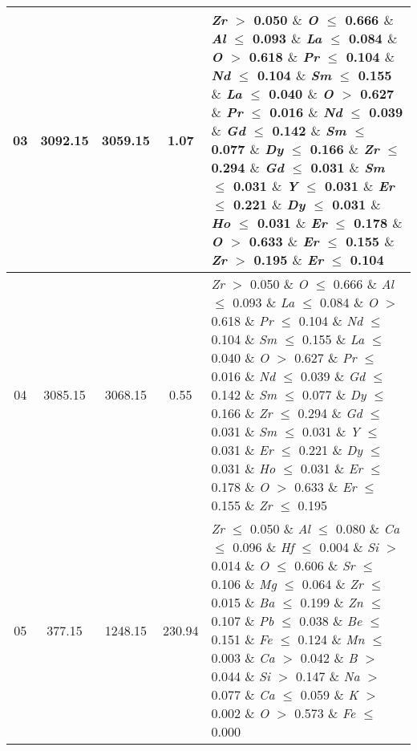 \begin{table}[!htbp]
\begin{tabular}{ccccp{}}
		\hline
		03 & 3092.15 & 3059.15 & 1.07 & \textit{Zr} $>$ 0.050 $\&$ \textit{O} $\le$ 0.666 $\&$ \textit{Al} $\le$ 0.093 $\&$ \textit{La} $\le$ 0.084 $\&$ \textit{O} $>$ 0.618 $\&$ \textit{Pr} $\le$ 0.104 $\&$ \textit{Nd} $\le$ 0.104 $\&$ \textit{Sm} $\le$ 0.155 $\&$ \textit{La} $\le$ 0.040 $\&$ \textit{O} $>$ 0.627 $\&$ \textit{Pr} $\le$ 0.016 $\&$ \textit{Nd} $\le$ 0.039 $\&$ \textit{Gd} $\le$ 0.142 $\&$ \textit{Sm} $\le$ 0.077 $\&$ \textit{Dy} $\le$ 0.166 $\&$ \textit{Zr} $\le$ 0.294 $\&$ \textit{Gd} $\le$ 0.031 $\&$ \textit{Sm} $\le$ 0.031 $\&$ \textit{Y} $\le$ 0.031 $\&$ \textit{Er} $\le$ 0.221 $\&$ \textit{Dy} $\le$ 0.031 $\&$ \textit{Ho} $\le$ 0.031 $\&$ \textit{Er} $\le$ 0.178 $\&$ \textit{O} $>$ 0.633 $\&$ \textit{Er} $\le$ 0.155 $\&$ \textit{Zr} $>$ 0.195 $\&$ \textit{Er} $\le$ 0.104\\
		\hline
		04 & 3085.15 & 3068.15 & 0.55 & \textit{Zr} $>$ 0.050 $\&$ \textit{O} $\le$ 0.666 $\&$ \textit{Al} $\le$ 0.093 $\&$ \textit{La} $\le$ 0.084 $\&$ \textit{O} $>$ 0.618 $\&$ \textit{Pr} $\le$ 0.104 $\&$ \textit{Nd} $\le$ 0.104 $\&$ \textit{Sm} $\le$ 0.155 $\&$ \textit{La} $\le$ 0.040 $\&$ \textit{O} $>$ 0.627 $\&$ \textit{Pr} $\le$ 0.016 $\&$ \textit{Nd} $\le$ 0.039 $\&$ \textit{Gd} $\le$ 0.142 $\&$ \textit{Sm} $\le$ 0.077 $\&$ \textit{Dy} $\le$ 0.166 $\&$ \textit{Zr} $\le$ 0.294 $\&$ \textit{Gd} $\le$ 0.031 $\&$ \textit{Sm} $\le$ 0.031 $\&$ \textit{Y} $\le$ 0.031 $\&$ \textit{Er} $\le$ 0.221 $\&$ \textit{Dy} $\le$ 0.031 $\&$ \textit{Ho} $\le$ 0.031 $\&$ \textit{Er} $\le$ 0.178 $\&$ \textit{O} $>$ 0.633 $\&$ \textit{Er} $\le$ 0.155 $\&$ \textit{Zr} $\le$ 0.195\\
		\hline
		05 & 377.15 & 1248.15 & 230.94 & \textit{Zr} $\le$ 0.050 $\&$ \textit{Al} $\le$ 0.080 $\&$ \textit{Ca} $\le$ 0.096 $\&$ \textit{Hf} $\le$ 0.004 $\&$ \textit{Si} $>$ 0.014 $\&$ \textit{O} $\le$ 0.606 $\&$ \textit{Sr} $\le$ 0.106 $\&$ \textit{Mg} $\le$ 0.064 $\&$ \textit{Zr} $\le$ 0.015 $\&$ \textit{Ba} $\le$ 0.199 $\&$ \textit{Zn} $\le$ 0.107 $\&$ \textit{Pb} $\le$ 0.038 $\&$ \textit{Be} $\le$ 0.151 $\&$ \textit{Fe} $\le$ 0.124 $\&$ \textit{Mn} $\le$ 0.003 $\&$ \textit{Ca} $>$ 0.042 $\&$ \textit{B} $>$ 0.044 $\&$ \textit{Si} $>$ 0.147 $\&$ \textit{Na} $>$ 0.077 $\&$ \textit{Ca} $\le$ 0.059 $\&$ \textit{K} $>$ 0.002 $\&$ \textit{O} $>$ 0.573 $\&$ \textit{Fe} $\le$ 0.000\\
		\hline

\end{tabular}
\end{table}
